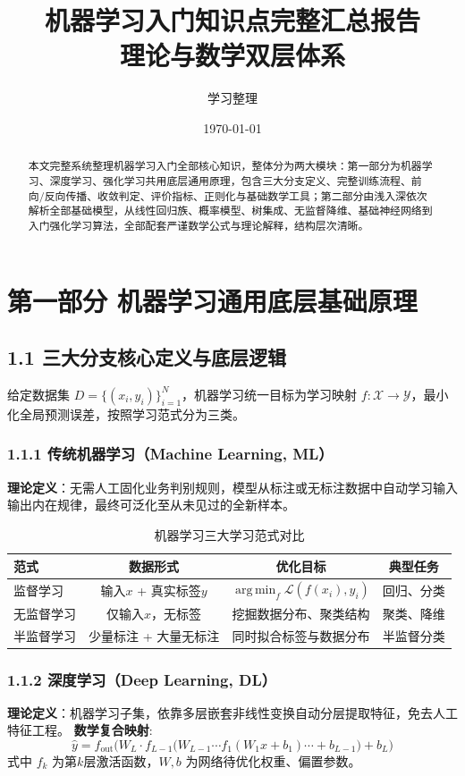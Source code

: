 \documentclass[11pt,a4paper]{article}
\title{机器学习入门知识点完整汇总报告\\理论与数学双层体系}
\author{学习整理}
\date{\today}
\DeclareMathOperator*{\argmin}{arg\,min}
\begin{document}
\maketitle
\begin{abstract}
本文完整系统整理机器学习入门全部核心知识，整体分为两大模块：第一部分为机器学习、深度学习、强化学习共用底层通用原理，包含三大分支定义、完整训练流程、前向/反向传播、收敛判定、评价指标、正则化与基础数学工具；第二部分由浅入深依次解析全部基础模型，从线性回归族、概率模型、树集成、无监督降维、基础神经网络到入门强化学习算法，全部配套严谨数学公式与理论解释，结构层次清晰。
\end{abstract}

\section{第一部分 机器学习通用底层基础原理}
\subsection{1.1 三大分支核心定义与底层逻辑}
给定数据集 $D=\{(x_i,y_i)\}_{i=1}^N$，机器学习统一目标为学习映射 $f:\mathcal{X}\to\mathcal{Y}$，最小化全局预测误差，按照学习范式分为三类。

\subsubsection{1.1.1 传统机器学习（Machine Learning, ML）}
\textbf{理论定义}：无需人工固化业务判别规则，模型从标注或无标注数据中自动学习输入输出内在规律，最终可泛化至从未见过的全新样本。
\begin{table}[htbp]
\centering
\caption{机器学习三大学习范式对比}
\label{tab:paradigm}
\begin{tabular}{@{}lccc@{}}
\toprule
范式 & 数据形式 & 优化目标 & 典型任务 \\
\midrule
监督学习 & 输入$x$ + 真实标签$y$ & $\displaystyle \argmin_f \mathcal{L}(f(x_i),y_i)$ & 回归、分类 \\
无监督学习 & 仅输入$x$，无标签 & 挖掘数据分布、聚类结构 & 聚类、降维 \\
半监督学习 & 少量标注 + 大量无标注 & 同时拟合标签与数据分布 & 半监督分类 \\
\bottomrule
\end{tabular}
\end{table}

\subsubsection{1.1.2 深度学习（Deep Learning, DL）}
\textbf{理论定义}：机器学习子集，依靠多层嵌套非线性变换自动分层提取特征，免去人工特征工程。
\textbf{数学复合映射}:
\[
\hat{y}=f_{\text{out}}\big(W_L \cdot f_{L-1}\big(W_{L-1}\cdots f_1(W_1 x+b_1)\cdots +b_{L-1}\big)+b_L\big)
\]
式中 $f_k$ 为第$k$层激活函数，$W,b$ 为网络待优化权重、偏置参数。
\end{document}
